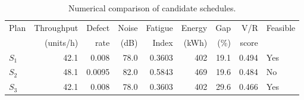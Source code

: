 \begin{table}[htbp]
\centering
\caption{Numerical comparison of candidate schedules.}
\label{tab:numerical-sim}
\small
\begin{tabular}{@{}lrrrrrrrl@{}}
\toprule
Plan & Throughput & Defect & Noise & Fatigue & Energy & Gap & V/R & Feasible \\
     & (units/h)  & rate   & (dB)  & Index   & (kWh)  & (\%) & score &         \\
\midrule
$S_{1}$ & 42.1 & 0.008 & 78.0 & 0.3603 & 402 & 19.1 & 0.494 & Yes \\
$S_{2}$ & 48.1 & 0.0095 & 82.0 & 0.5843 & 469 & 19.6 & 0.484 & No \\
$S_{3}$ & 42.1 & 0.008 & 78.0 & 0.3603 & 402 & 29.6 & 0.466 & Yes \\
\bottomrule
\end{tabular}
\end{table}
